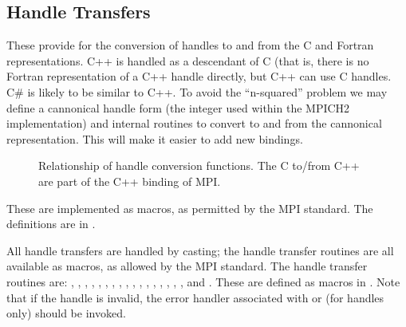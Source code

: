 \documentclass{article}
\begin{document}
\subsection{Handle Transfers}
\label{sec:handle-transfer}
These provide for the conversion of handles to and from the C and
Fortran representations.  C++ is handled as a descendant of C (that
is, there is no Fortran representation of a C++ handle directly, but
C++ can use C handles.  C\# is likely to be similar to C++.  To avoid
the ``n-squared'' problem we may define a cannonical handle form (the
integer used within the MPICH2 implementation) and internal routines
to convert to and from the cannonical representation.  This will make
it easier to add new bindings.

\begin{figure}
\centerline{}
\caption{Relationship of handle conversion functions.  The C to/from
C++ are part of the C++ binding of MPI.}\label{fig:handle-transfers}
\end{figure}
These are implemented as macros, as permitted by the MPI standard.
The definitions are in .


All handle transfers are handled by casting;
the handle transfer routines are all available as macros, as allowed by
the MPI standard.  The handle transfer routines are:
,
,
,
,
,
,
,
,
,
,
,
,
,
,
,
,
, and
.
These are defined as macros in .  Note that if the handle is
invalid, the error handler associated with  or
 (for  handles only) should be
invoked.
\end{document}
